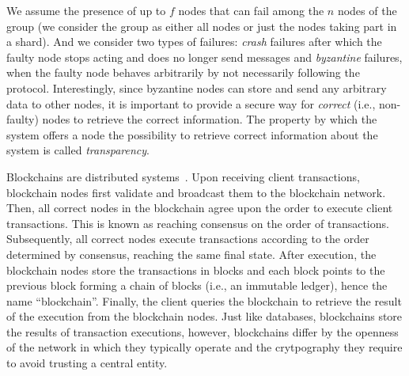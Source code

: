 \documentclass[11pt,dvipdfm]{article}
\newcommand{\vincent}[1]{\emph{Vincent: #1}}%
\newcommand{\deepal}[1]{\emph{Deepal: #1}}%
\begin{document}
We assume the presence of up to $f$ nodes that can fail among the $n$ nodes of the group (we consider the group as either all nodes or just the nodes taking part in a shard).
And we consider two types of failures: \emph{crash} failures after which the faulty node stops acting and does no longer send messages
and \emph{byzantine} failures, when the faulty node behaves arbitrarily by not necessarily following the protocol.
Interestingly, since byzantine nodes can store and send any arbitrary data to other nodes, it is important to provide a secure way for \emph{correct} (i.e., non-faulty) nodes to retrieve the correct information. The property by which the system offers a node the possibility to retrieve correct information about the system is called \emph{transparency}.



Blockchains are distributed systems~\cite{Nak08}. Upon receiving client transactions, blockchain nodes first validate and broadcast them to the blockchain network. Then, all correct nodes in the blockchain agree upon the order to execute client transactions. This is known as reaching consensus on the order of transactions. Subsequently, all correct nodes execute transactions according to the order determined by consensus, reaching the same final state. After execution, the blockchain nodes store the transactions in blocks and each block points to the previous block forming a chain of blocks (i.e., an immutable ledger), hence the name ``blockchain''. Finally, the client queries the blockchain to retrieve the result of the execution from the blockchain nodes. 
Just like databases, blockchains store the results of transaction executions, however, blockchains differ by the openness of the network in which they typically operate and the crytpography they require to avoid trusting a central entity.

\end{document}
